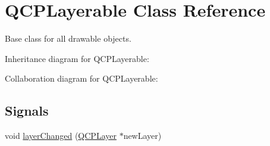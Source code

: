 \hypertarget{class_q_c_p_layerable}{}\section{Q\+C\+P\+Layerable Class Reference}
\label{class_q_c_p_layerable}


Base class for all drawable objects.  




Inheritance diagram for Q\+C\+P\+Layerable\+:


Collaboration diagram for Q\+C\+P\+Layerable\+:
\subsection*{Signals}
\begin{DoxyCompactItemize}
\item 
void \hyperlink{class_q_c_p_layerable_abbf8657cedea73ac1c3499b521c90eba}{layer\+Changed} (\hyperlink{class_q_c_p_layer}{Q\+C\+P\+Layer} $\ast$new\+Layer)
\end{DoxyCompactItemize}
